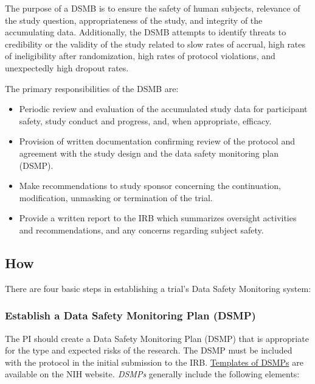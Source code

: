 \documentclass[]{book}
\providecommand{\tightlist}{%
  \setlength{\itemsep}{0pt}\setlength{\parskip}{0pt}}
\theoremstyle{definition}
\theoremstyle{definition}
\theoremstyle{definition}
\theoremstyle{remark}
\begin{document}
The purpose of a DSMB is to ensure the safety of human subjects,
relevance of the study question, appropriateness of the study, and
integrity of the accumulating data. Additionally, the DSMB attempts to
identify threats to credibility or the validity of the study related to
slow rates of accrual, high rates of ineligibility after randomization,
high rates of protocol violations, and unexpectedly high dropout rates.

The primary responsibilities of the DSMB are:

\begin{itemize}
\tightlist
\item
  Periodic review and evaluation of the accumulated study data for
  participant safety, study conduct and progress, and, when appropriate,
  efficacy.
\item
  Provision of written documentation confirming review of the protocol
  and agreement with the study design and the data safety monitoring
  plan (DSMP).
\item
  Make recommendations to study sponsor concerning the continuation,
  modification, unmasking or termination of the trial.
\item
  Provide a written report to the IRB which summarizes oversight
  activities and recommendations, and any concerns regarding subject
  safety.
\end{itemize}

\subsection{How}\label{how-9}

There are four basic steps in establishing a trial's Data Safety
Monitoring system:

\subsubsection{Establish a Data Safety Monitoring Plan
(DSMP)}\label{establish-a-data-safety-monitoring-plan-dsmp}

The PI should create a Data Safety Monitoring Plan (DSMP) that is
appropriate for the type and expected risks of the research. The DSMP
must be included with the protocol in the initial submission to the IRB.
\href{https://www.nia.nih.gov/research/dgcg/clinical-research-study-investigators-toolbox/data-and-safety-monitorin}{Templates
of DSMPs} are available on the NIH website\emph{. DSMPs} generally
include the following elements:
\end{document}
